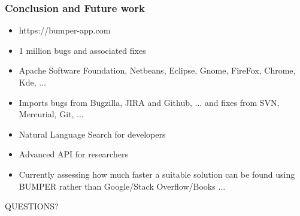 \documentclass{beamer}
\begin{document}
\begin{frame}
\frametitle{Conclusion and Future work}

\begin{itemize}
\item https://bumper-app.com
\item 1 million bugs and associated fixes
\item Apache Software Foundation, Netbeans, Eclipse, Gnome, FireFox, Chrome, Kde, ...
\item Imports bugs from Bugzilla, JIRA and Github, ... and fixes from SVN, Mercurial, Git, ...
\item Natural Language Search for developers
\item Advanced API for researchers
\vspace{0.5cm}
\item Currently assessing how much faster a suitable solution can be found using BUMPER rather than Google/Stack Overflow/Books ...
\end{itemize}



\end{frame}




\begin{frame}
\Huge{\centerline{QUESTIONS?}}
\end{frame}

\end{document}
